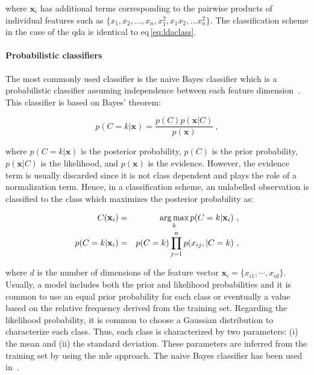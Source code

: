 \noindent where $\mathbf{x}_i$ has additional terms corresponding to the pairwise products of individual features such as $\{x_1, x_2, \dots , x_n, x_1^2, x_1x_2, \dots x_n^2\}$.
The classification scheme in the case of the \ac{qda} is identical to \acs{eq}\,\eqref{eq:ldaclass}.

\paragraph{Probabilistic classifiers}
The most commonly used classifier is the naive Bayes classifier which is a probabilistic classifier assuming independence between each feature dimension~\cite{Rish2001}.
This classifier is based on Bayes' theorem:

\begin{equation}
	p(C=k|\mathbf{x}) = \frac{p(C)p(\mathbf{x}|C)}{p(\mathbf{x})} \ ,
	\label{eq:bayth}
\end{equation}

\noindent where $p(C=k|\mathbf{x})$ is the posterior probability, $p(C)$ is the prior probability, $p(\mathbf{x}|C)$ is the likelihood, and $p(\mathbf{x})$ is the evidence. 
However, the evidence term is usually discarded since it is not class dependent and plays the role of a normalization term.
Hence, in a classification scheme, an unlabelled observation is classified to the class which maximizes the posterior probability as:

\begin{eqnarray}
	C(\mathbf{x}_i) & = & \operatorname*{arg\,max}_k p(C=k|\mathbf{x}_i) \ , \label{eq:maxbay} \\
	p(C=k|\mathbf{x}_i) & = & p(C=k) \prod_{j=1}^{n} p(x_{ij},|C=k) \ , \label{eq:postbay}
\end{eqnarray}

\noindent where $d$ is the number of dimensions of the feature vector $\mathbf{x}_i = \{x_{i1},\cdots,x_{id}\}$.
Usually, a model includes both the prior and likelihood probabilities and it is common to use an equal prior probability for each class or eventually a value based on the relative frequency derived from the training set.
Regarding the likelihood probability, it is common to choose a Gaussian distribution to characterize each class.
Thus, each class is characterized by two parameters: (i) the mean and (ii) the standard deviation.
These parameters are inferred from the training set by using the \ac{mle} approach.
The naive Bayes classifier has been used in~\cite{Giannini2013,Mazzetti2011,Niaf2011,Niaf2012,Niaf2012,cameron2014multiparametric,cameron2016maps,rampun2015classifying,rampun2016computerb,rampun2015computer,rampun2016computer}.

